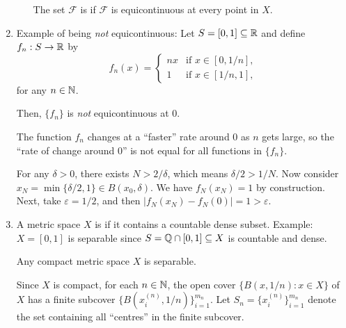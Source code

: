\begin{enumerate}
\begin{itemize}
The set \(\mathcal{F}\) is  if \(\mathcal{F}\) is
equicontinuous at every point in \(X\).
\end{itemize}

\item Example of being \emph{not} equicontinuous: Let \(S=[0,1]\subseteq \mathbb{R}\)
and define \(f_n:S\to\mathbb{R}\) by
\[
f_n(x)=\begin{cases}
nx&\text{if \(x\in[0,1/n]\)}, \\
1&\text{if \(x\in[1/n,1]\)},
\end{cases}
\]
for any \(n\in\mathbb{N}\).
\begin{center}
\end{center}

Then, \(\{f_n\}\) is \emph{not} equicontinuous at 0.
\begin{intuition}
The function \(f_n\) changes at a ``faster'' rate around \(0\) as \(n\) gets
large, so the ``rate of change around \(0\)'' is not equal for all functions in
\(\{f_n\}\).
\end{intuition}

\begin{pf}
For any \(\delta>0\), there exists \(N>2/\delta\), which means
\(\delta/2>1/N\). Now consider \(x_N=\min\{\delta/2,1\}\in B(x_0,\delta)\). We
have \(f_N(x_N)=1\) by construction. Next, take \(\varepsilon=1/2\), and then
\(|f_N(x_N)-f_N(0)|=1>\varepsilon\).
\end{pf}

\item A metric space \(X\) is  if it contains a countable dense
subset. Example: \(X=[0,1]\) is separable since \(S=\mathbb{Q}\cap[0,1]\subseteq X\) is
countable and dense.
\begin{lemma}
\label{lma:cpt-separable}
Any compact metric space \(X\) is separable.
\end{lemma}
\begin{pf}
Since \(X\) is compact, for each \(n\in\mathbb{N}\), the open cover \(\{B(x,1/n):x\in
X\}\) of \(X\) has a finite subcover \(\{B(x_i^{(n)},1/n)\}_{i=1}^{m_n}\). Let
\(S_n=\{x_i^{(n)}\}_{i=1}^{m_n}\) denote the set containing all ``centres'' in
the finite subcover.


\end{pf}
\end{enumerate}

